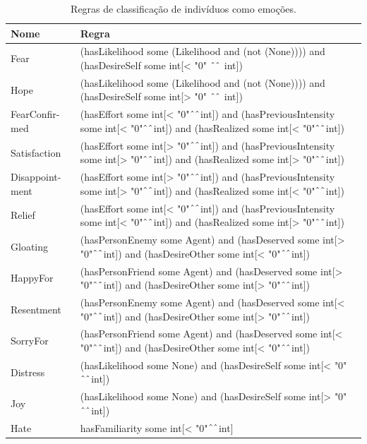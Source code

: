 \begin{table}[pt]
	\caption{Regras de classificação de indivíduos como emoções.}
	\label{table:lucca-emo}
	\begin{center}
	\begin{tabular}{|p{20mm}|p{120mm}|} %
		\hline
		Nome & Regra \\ \hline
		Fear & (hasLikelihood some (Likelihood and (not (None)))) and (hasDesireSelf some int[< "0" $\UP\UP$ int]) \\ \hline
		Hope & (hasLikelihood some (Likelihood and (not (None)))) and (hasDesireSelf some int[> "0" $\UP\UP$ int]) \\ \hline
		FearConfir-med & (hasEffort some int[< "0"$\UP\UP$int]) and (hasPreviousIntensity some int[< "0"$\UP\UP$int]) and (hasRealized some int[< "0"$\UP\UP$int]) \\ \hline
		Satisfaction & (hasEffort some int[> "0"$\UP\UP$int]) and (hasPreviousIntensity some int[> "0"$\UP\UP$int]) and (hasRealized some int[> "0"$\UP\UP$int]) \\ \hline
		Disappoint-ment & (hasEffort some int[> "0"$\UP\UP$int]) and (hasPreviousIntensity some int[> "0"$\UP\UP$int]) and (hasRealized some int[< "0"$\UP\UP$int]) \\ \hline
		Relief & (hasEffort some int[< "0"$\UP\UP$int]) and (hasPreviousIntensity some int[< "0"$\UP\UP$int]) and (hasRealized some int[> "0"$\UP\UP$int]) \\ \hline
		Gloating & (hasPersonEnemy some Agent) and (hasDeserved some int[> "0"$\UP\UP$int]) and (hasDesireOther some int[< "0"$\UP\UP$int]) \\ \hline
		HappyFor & (hasPersonFriend some Agent) and (hasDeserved some int[> "0"$\UP\UP$int]) and (hasDesireOther some int[> "0"$\UP\UP$int]) \\ \hline
		Resentment & (hasPersonEnemy some Agent) and (hasDeserved some int[< "0"$\UP\UP$int]) and (hasDesireOther some int[> "0"$\UP\UP$int]) \\ \hline
		SorryFor & (hasPersonFriend some Agent) and (hasDeserved some int[< "0"$\UP\UP$int]) and (hasDesireOther some int[< "0"$\UP\UP$int]) \\ \hline
		Distress & (hasLikelihood some None) and (hasDesireSelf some int[< "0"$\UP\UP$int]) \\ \hline
		Joy & (hasLikelihood some None) and (hasDesireSelf some int[> "0"$\UP\UP$int]) \\ \hline
		Hate & hasFamiliarity some int[< "0"$\UP\UP$int]\\ \hline

\end{tabular}
\end{center}
\end{table}
